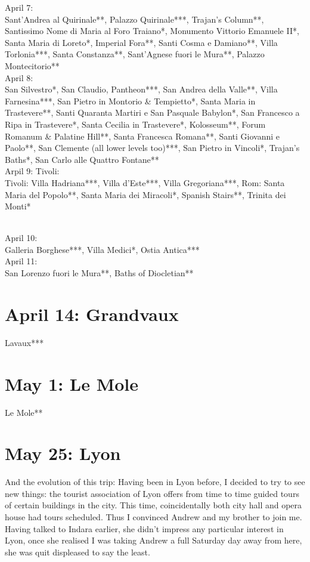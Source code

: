 April 7:\\
Sant'Andrea al Quirinale**, Palazzo Quirinale***, Trajan's Column**, Santissimo Nome di Maria al Foro Traiano*, Monumento Vittorio Emanuele II*, Santa Maria di Loreto*, Imperial Fora**, Santi Cosma e Damiano**, Villa Torlonia***,  Santa Constanza**, Sant'Agnese fuori le Mura**, Palazzo Montecitorio**\\

April 8:\\
San Silvestro*, San Claudio, Pantheon***, San Andrea della Valle**, Villa Farnesina***, San Pietro in Montorio \& Tempietto*, Santa Maria in Trastevere**, Santi Quaranta Martiri e San Pasquale Babylon*, San Francesco a Ripa in Trastevere*, Santa Cecilia in Trastevere*, Kolosseum**, Forum Romanum \& Palatine Hill**, Santa Francesca Romana**, Santi Giovanni e Paolo**, San Clemente (all lower levels too)***, San Pietro in Vincoli*, Trajan's Baths*, San Carlo alle Quattro Fontane**\\

Arpil 9: Tivoli:\\
Tivoli: Villa Hadriana***, Villa d'Este***, Villa Gregoriana***, Rom: Santa Maria del Popolo**, Santa Maria dei Miracoli*, Spanish Stairs**, Trinita dei Monti*\\\

April 10:\\
Galleria Borghese***, Villa Medici*, Ostia Antica***\\

April 11:\\
San Lorenzo fuori le Mura**, Baths of Diocletian**

\section{April 14: Grandvaux}
\label{Lavaux2013}

Lavaux***

\section{May 1: Le Mole}
\label{Mole2013}

Le Mole**

\section{May 25: Lyon}
\label{Lyon2013}

And the evolution of this trip: Having been in Lyon before, I decided to try to see new things: the tourist association of Lyon offers from time to time guided tours of certain buildings in the city. This time, coincidentally both city hall and opera house had tours scheduled. Thus I convinced Andrew and my brother to join me. Having talked to Indara earlier, she didn't impress any particular interest in Lyon, once she realised I was taking Andrew a full Saturday day away from here, she was quit displeased to say the least.\\

